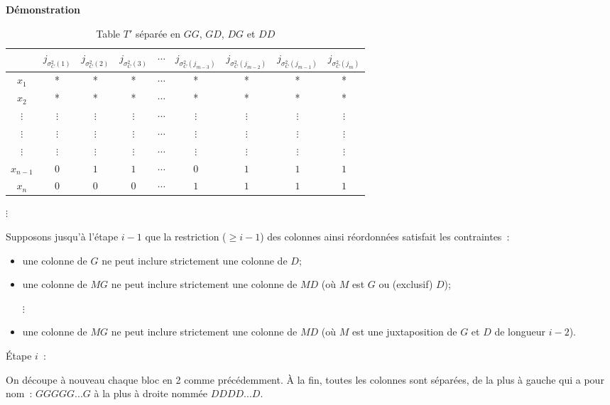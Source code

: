 \documentclass[a4paper]{report}
\renewcommand{\textbf}[1]{\begingroup\bfseries\mathversion{bold}#1\endgroup}
\newenvironment{preuve}{\textbf{Démonstration}}{}
\begin{document}
\begin{preuve}
\begin{table}[htb]
 \centering
\begin{tabular}{ |c | c | c |c | c | c | c | c |c |}
\hline
 & $j_{\sigma_{C}^{2}(1)}$ & $j_{\sigma_{C}^{2}(2)}$ & $j_{\sigma_{C}^{2}(3)}$ & $\cdots$  & $j_{\sigma_{C}^{2}(j_{m - 3})}$ & $j_{\sigma_{C}^{2}(j_{m - 2})}$ & $j_{\sigma_{C}^{2}(j_{m - 1})}$ & $j_{\sigma_{C}^{2}(j_{m})}$\\
\hline
$x_1$ & * & * & * & $\cdots$ & * & * & * & *\\
\hline
$x_2$ & * & * & * & $\cdots$ & * & * & * & *\\
\hline
$\vdots$ & $\vdots$ & $\vdots$ & $\vdots$ & $\cdots$ & $\vdots$ & $\vdots$ & $\vdots$ & $\vdots$\\
\hline
$\vdots$ & $\vdots$ & $\vdots$ & $\vdots$ & $\cdots$ & $\vdots$ & $\vdots$ & $\vdots$ & $\vdots$\\
\hline
$\vdots$ & $\vdots$ & $\vdots$ & $\vdots$ & $\cdots$ & $\vdots$ & $\vdots$ & $\vdots$ & $\vdots$\\
\hline
$x_{n-1}$ & $0$ & $1$ & $1$ & $\cdots$ & $0$ & $1$ & $1$ & $1$\\
\hline
$x_n$ & $0$ & $0$ & $0$ & $\cdots$ & $1$ & $1$ & $1$ & $1$\\
\hline
\end{tabular}
\caption{Table $T'$ séparée en $GG$, $GD$, $DG$ et $DD$ }
\end{table}

$\vdots$

Supposons jusqu'à l'étape $i - 1$ que la restriction ($\geqslant i - 1$)  des colonnes ainsi réordonnées satisfait 
les contraintes~:
\begin{itemize}
 \item une colonne de $G$ ne peut inclure strictement une colonne de $D$;
 \item une colonne de $MG$ ne peut inclure strictement une colonne de $MD$ (où $M$ est $G$ ou (exclusif) $D$);

 $\vdots$

 \item une colonne de $MG$ ne peut inclure strictement une colonne de $MD$ (où $M$ est une juxtaposition de $G$ et $D$ 
de longueur $i -2$).

\end{itemize}


\'Etape $i$~:
 
On découpe à nouveau chaque bloc en 2 comme précédemment.
\`A la fin, toutes les colonnes sont séparées, de la plus à gauche qui a pour nom~: $GGGGG...G$ à la plus à droite
 nommée $DDDD...D$.


\end{preuve}
\end{document}
